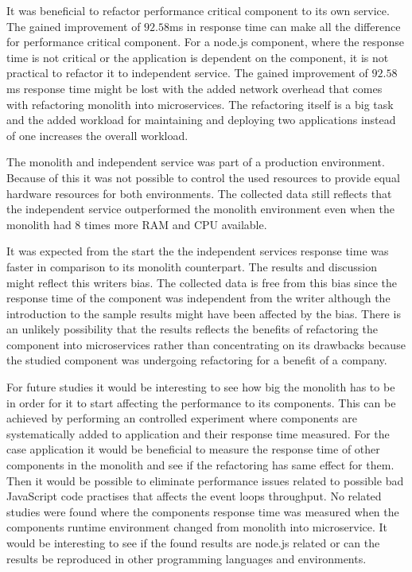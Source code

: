 It was beneficial to refactor performance critical component to its own service. 
The gained improvement of $92.58$ms in response time can make all the difference for performance critical component.
For a node.js component, where the response time is not critical or the application is dependent on the component, it is not practical to refactor it to independent service.
The gained improvement of $92.58$ms response time might be lost with the added network overhead that comes with refactoring monolith into microservices.
The refactoring itself is a big task and the added workload for maintaining and deploying two applications instead of one increases the overall workload.

The monolith and independent service was part of a production environment.
Because of this it was not possible to control the used resources to provide equal hardware resources for both environments.
The collected data still reflects that the independent service outperformed the monolith environment even when the monolith had $8$ times more RAM and CPU available.

It was expected from the start the the independent services response time was faster in comparison to its monolith counterpart.
The results and discussion might reflect this writers bias.
The collected data is free from this bias since the response time of the component was independent from the writer although the introduction to the sample results might have been affected by the bias.
There is an unlikely possibility that the results reflects the benefits of refactoring the component into microservices rather than concentrating on its drawbacks because the studied component was undergoing refactoring for a benefit of a company.

For future studies it would be interesting to see how big the monolith has to be in order for it to start affecting the performance to its components.
This can be achieved by performing an controlled experiment where components are systematically added to application and their response time measured.
For the case application it would be beneficial to measure the response time of other components in the monolith and see if the refactoring has same effect for them.
Then it would be possible to eliminate  performance issues related to possible bad JavaScript code practises that affects the event loops throughput.
No related studies were found where the components response time was measured when the components runtime environment changed from monolith into microservice.
It would be interesting to see if the found results are node.js related or can the results be reproduced in other programming languages and environments.
